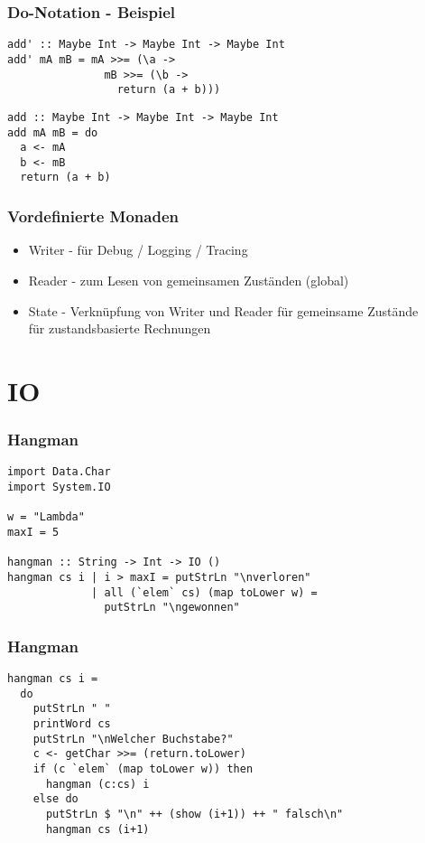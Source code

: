 \begin{frame}[fragile]
\frametitle{Do-Notation - Beispiel}
\begin{lstlisting}
add' :: Maybe Int -> Maybe Int -> Maybe Int
add' mA mB = mA >>= (\a ->
               mB >>= (\b ->
                 return (a + b)))
\end{lstlisting}	
\pause
\begin{lstlisting}
add :: Maybe Int -> Maybe Int -> Maybe Int
add mA mB = do
  a <- mA
  b <- mB
  return (a + b)
\end{lstlisting}
\end{frame}

\begin{frame}
\frametitle{Vordefinierte Monaden}
\begin{block}{\vspace*{-3ex}}
\begin{itemize}
\item Writer - für Debug / Logging / Tracing
\item Reader - zum Lesen von gemeinsamen Zuständen (global)
\item State - Verknüpfung von Writer und Reader für gemeinsame Zustände
\\ für zustandsbasierte Rechnungen
\end{itemize}
\end{block}
\end{frame}

\section{IO}

\begin{frame}[fragile]
\frametitle{Hangman}
\begin{lstlisting}
import Data.Char
import System.IO

w = "Lambda"
maxI = 5

hangman :: String -> Int -> IO ()
hangman cs i | i > maxI = putStrLn "\nverloren"
             | all (`elem` cs) (map toLower w) = 
               putStrLn "\ngewonnen"
\end{lstlisting}	
\end{frame}

\begin{frame}[fragile]
\frametitle{Hangman}
\begin{lstlisting}
hangman cs i = 
  do
    putStrLn " "
    printWord cs
    putStrLn "\nWelcher Buchstabe?"
    c <- getChar >>= (return.toLower)
    if (c `elem` (map toLower w)) then
      hangman (c:cs) i 
    else do
      putStrLn $ "\n" ++ (show (i+1)) ++ " falsch\n"
      hangman cs (i+1)
\end{lstlisting}	
\end{frame}

